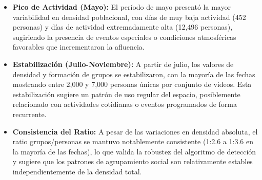 \begin{itemize}
	\item \textbf{Pico de Actividad (Mayo):} El período de mayo presentó la mayor variabilidad en densidad poblacional, con días de muy baja actividad (452 personas) y días de actividad extremadamente alta (12,496 personas), sugiriendo la presencia de eventos especiales o condiciones atmosféricas favorables que incrementaron la afluencia.
	
	\item \textbf{Estabilización (Julio-Noviembre):} A partir de julio, los valores de densidad y formación de grupos se estabilizaron, con la mayoría de las fechas mostrando entre 2,000 y 7,000 personas únicas por conjunto de videos. Esta estabilización sugiere un patrón de uso regular del espacio, posiblemente relacionado con actividades cotidianas o eventos programados de forma recurrente.
	
	\item \textbf{Consistencia del Ratio:} A pesar de las variaciones en densidad absoluta, el ratio grupos/personas se mantuvo notablemente consistente (1:2.6 a 1:3.6 en la mayoría de las fechas), lo que valida la robustez del algoritmo de detección y sugiere que los patrones de agrupamiento social son relativamente estables independientemente de la densidad total.
\end{itemize}